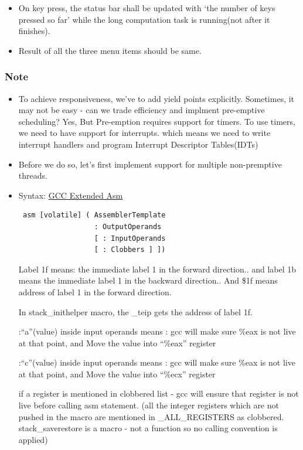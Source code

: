 \documentclass[]{book}
\begin{document}
\begin{itemize}
\itemsep1pt\parskip0pt
\item
  On key press, the status bar shall be updated with `the number of keys
  pressed so far' while the long computation task is running(not after
  it finishes).
\item
  Result of all the three menu items should be same.
\end{itemize}

\subsubsection*{Note}\label{note-7}

\begin{itemize}
\item
  To achieve responsiveness, we've to add yield points explicitly.
  Sometimes, it may not be easy - can we trade efficiency and implment
  pre-emptive scheduling? Yes, But Pre-emption requires support for
  timers. To use timers, we need to have support for interrupts. which
  means we need to write interrupt handlers and program Interrupt
  Descriptor Tables(IDTs)
\item
  Before we do so, let's first implement support for multiple
  non-premptive threads.
\item
  Syntax:
  \href{https://gcc.gnu.org/onlinedocs/gcc/Extended-Asm.html}{GCC
  Extended Asm}

\begin{verbatim}
 asm [volatile] ( AssemblerTemplate
                  : OutputOperands
                  [ : InputOperands
                  [ : Clobbers ] ])
\end{verbatim}

  Label 1f means: the immediate label 1 in the forward direction.. and
  label 1b means the immediate label 1 in the backward direction.. And
  \$1f means address of label 1 in the forward direction.

  In stack\_inithelper macro, the \_teip gets the address of label 1f.

  :``a''(value) inside input operands means : gcc will make sure \%eax
  is not live at that point, and Move the value into ``\%eax'' register

  :``c''(value) inside input operands means : gcc will make sure \%eax
  is not live at that point, and Move the value into ``\%ecx'' register

  if a register is mentioned in clobbered list - gcc will ensure that
  register is not live before calling asm statement. (all the integer
  registers which are not pushed in the macro are mentioned in
  \_ALL\_REGISTERS as clobbered. stack\_saverestore is a macro - not a
  function so no calling convention is applied)
\end{itemize}
\end{document}
